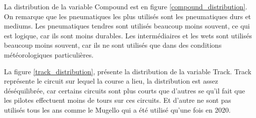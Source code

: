 
La distribution de la variable Compound est en figure \ref{compound_distribution}.
On remarque que les pneumatiques les plus utilisés sont les pneumatiques durs et mediums. Les pneumatiques tendres sont utilisés beaucoup moins souvent, ce qui est logique, car ils sont moins durables.
Les intermédiaires et les wets sont utilisés beaucoup moins souvent, car ils ne sont utilisés que dans des conditions météorologiques particulières.


La figure \ref{track_distribution}, présente la distribution de la variable Track.
Track représente le circuit sur lequel la course a lieu, la distribution est assez déséquilibrée, car certains circuits sont plus courts que d'autres se qu'il fait que les pilotes effectuent moins de tours sur ces circuits.
Et d'autre ne sont pas utilisés tous les ans comme le Mugello qui a été utilisé qu'une fois en 2020.


